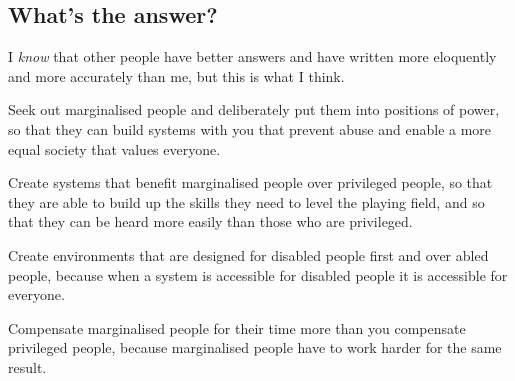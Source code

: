\documentclass[10pt]{article}
\begin{document}
\begin{multicols}{2}
\section{What’s the answer?}

I \emph{know} that other people have better answers and have written more eloquently and more accurately than me, but this is what I think.

Seek out marginalised people and deliberately put them into positions of power, so that they can build systems with you that prevent abuse and enable a more equal society that values everyone.

Create systems that benefit marginalised people over privileged people, so that they are able to build up the skills they need to level the playing field, and so that they can be heard more easily than those who are privileged.

Create environments that are designed for disabled people first and over abled people, because when a system is accessible for disabled people it is accessible for everyone.

Compensate marginalised people for their time more than you compensate privileged people, because marginalised people have to work harder for the same result.

\end{multicols}
\end{document}
